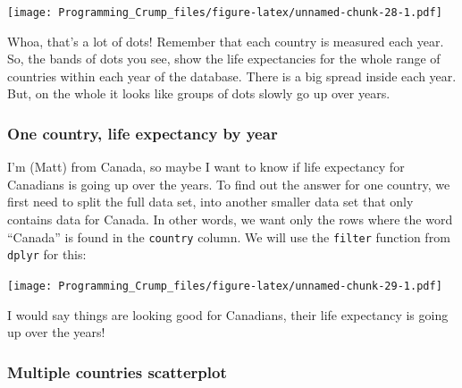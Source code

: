 \documentclass[]{book}
\newenvironment{Shaded}{\begin{snugshade}}{\end{snugshade}}
\newcommand{\KeywordTok}[1]{\textcolor[rgb]{0.13,0.29,0.53}{\textbf{{#1}}}}
\newcommand{\DataTypeTok}[1]{\textcolor[rgb]{0.13,0.29,0.53}{{#1}}}
\newcommand{\StringTok}[1]{\textcolor[rgb]{0.31,0.60,0.02}{{#1}}}
\newcommand{\CommentTok}[1]{\textcolor[rgb]{0.56,0.35,0.01}{\textit{{#1}}}}
\newcommand{\NormalTok}[1]{{#1}}
\theoremstyle{definition}
\theoremstyle{definition}
\theoremstyle{definition}
\theoremstyle{remark}
\begin{document}
\texttt{[image: Programming\_Crump\_files/figure-latex/unnamed-chunk-28-1.pdf]}

Whoa, that's a lot of dots! Remember that each country is measured each
year. So, the bands of dots you see, show the life expectancies for the
whole range of countries within each year of the database. There is a
big spread inside each year. But, on the whole it looks like groups of
dots slowly go up over years.

\subsubsection{One country, life expectancy by
year}\label{one-country-life-expectancy-by-year}

I'm (Matt) from Canada, so maybe I want to know if life expectancy for
Canadians is going up over the years. To find out the answer for one
country, we first need to split the full data set, into another smaller
data set that only contains data for Canada. In other words, we want
only the rows where the word ``Canada'' is found in the \texttt{country}
column. We will use the \texttt{filter} function from \texttt{dplyr} for
this:

\begin{Shaded}
\end{Shaded}

\texttt{[image: Programming\_Crump\_files/figure-latex/unnamed-chunk-29-1.pdf]}

I would say things are looking good for Canadians, their life expectancy
is going up over the years!

\subsubsection{Multiple countries
scatterplot}\label{multiple-countries-scatterplot}
\end{document}
